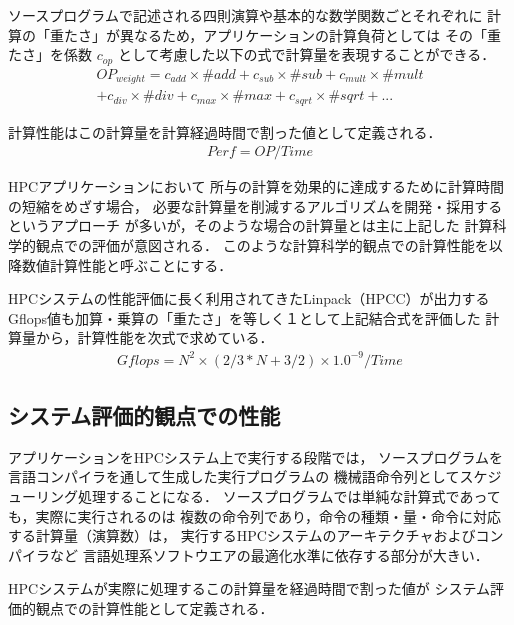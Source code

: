 \documentclass[submit,techrep,noauthor]{ipsj}
\begin{document}
ソースプログラムで記述される四則演算や基本的な数学関数ごとそれぞれに
計算の「重たさ」が異なるため，アプリケーションの計算負荷としては
その「重たさ」を係数
\begin{math} c_{op} \end{math}
として考慮した以下の式で計算量を表現することができる．
\begin{align*}
OP_{weight} =
	c_{add}\times \#add + c_{sub}\times \#sub + c_{mult}\times \#mult \\
	+ c_{div}\times \#div + c_{max}\times \#max + c_{sqrt}\times \#sqrt + ...
\end{align*}

計算性能はこの計算量を計算経過時間で割った値として定義される．
\begin{align*}
Perf = OP / Time	%
\end{align*}

HPCアプリケーションにおいて
所与の計算を効果的に達成するために計算時間の短縮をめざす場合，
必要な計算量を削減するアルゴリズムを開発・採用するというアプローチ
が多いが，そのような場合の計算量とは主に上記した
計算科学的観点での評価が意図される．
このような計算科学的観点での計算性能を以降数値計算性能と呼ぶことにする．

HPCシステムの性能評価に長く利用されてきたLinpack（HPCC）が出力する
Gflops値も加算・乗算の「重たさ」を等しく１として上記結合式を評価した
計算量から，計算性能を次式で求めている．
\begin{align*}
Gflops = N^{2} \times ( 2/3 * N + 3/2 ) \times 1.0^{-9} / Time 
\end{align*}



\subsection {システム評価的観点での性能}
\label{subsection:system-perf}

アプリケーションをHPCシステム上で実行する段階では，
ソースプログラムを言語コンパイラを通して生成した実行プログラムの
機械語命令列としてスケジューリング処理することになる．
ソースプログラムでは単純な計算式であっても，実際に実行されるのは
複数の命令列であり，命令の種類・量・命令に対応する計算量（演算数）は，
実行するHPCシステムのアーキテクチャおよびコンパイラなど
言語処理系ソフトウエアの最適化水準に依存する部分が大きい．

HPCシステムが実際に処理するこの計算量を経過時間で割った値が
システム評価的観点での計算性能として定義される．
\end{document}
